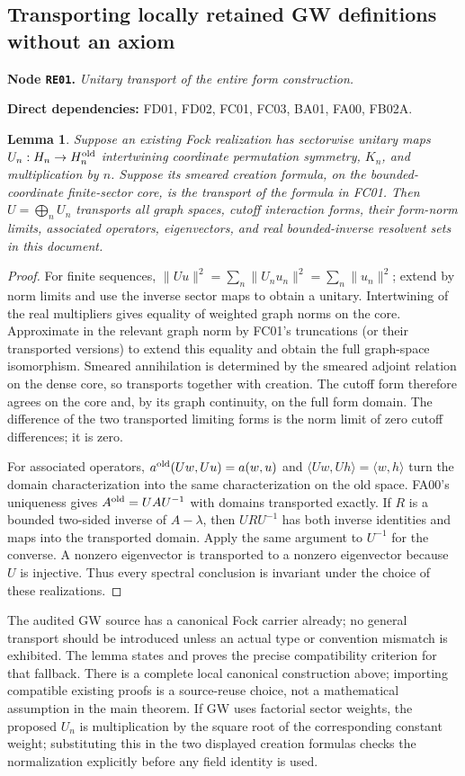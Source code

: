 \documentclass[11pt,a4paper]{article}
\newtheorem{lemma}[theorem]{Lemma}
\theoremstyle{remark}\newtheorem{remark}[theorem]{Remark}
\newcommand{\node}[3]{\par\Needspace{6\baselineskip}\smallskip\hypertarget{node:#1}{}\label{nodepage:#1}\noindent\textbf{Node \texttt{#1}.} \textit{#2.}\par\noindent\textbf{Direct dependencies:} #3.\par}
\begin{document}
\subsection{Transporting locally retained GW definitions without an axiom}
\node{RE01}{Unitary transport of the entire form construction}{FD01, FD02, FC01, FC03, BA01, FA00, FB02A}
\begin{lemma}\label{lem:GWtransport}
Suppose an existing Fock realization has sectorwise unitary maps $U_n:H_n\to H_n^{\rm old}$ intertwining coordinate permutation symmetry, $K_n$, and multiplication by $n$. Suppose its smeared creation formula, on the bounded-coordinate finite-sector core, is the transport of the formula in FC01. Then $U=\bigoplus_nU_n$ transports all graph spaces, cutoff interaction forms, their form-norm limits, associated operators, eigenvectors, and real bounded-inverse resolvent sets in this document.
\end{lemma}
\begin{proof}
For finite sequences, $\|Uu\|^2=\sum_n\|U_nu_n\|^2=\sum_n\|u_n\|^2$; extend by norm limits and use the inverse sector maps to obtain a unitary. Intertwining of the real multipliers gives equality of weighted graph norms on the core. Approximate in the relevant graph norm by FC01's truncations (or their transported versions) to extend this equality and obtain the full graph-space isomorphism. Smeared annihilation is determined by the smeared adjoint relation on the dense core, so transports together with creation. The cutoff form therefore agrees on the core and, by its graph continuity, on the full form domain. The difference of the two transported limiting forms is the norm limit of zero cutoff differences; it is zero.

For associated operators, $a^{\rm old}(Uw,Uu)=a(w,u)$ and $\langle Uw,Uh\rangle=\langle w,h\rangle$ turn the domain characterization into the same characterization on the old space. FA00's uniqueness gives $A^{\rm old}=UAU^{-1}$ with domains transported exactly. If $R$ is a bounded two-sided inverse of $A-\lambda$, then $URU^{-1}$ has both inverse identities and maps into the transported domain. Apply the same argument to $U^{-1}$ for the converse. A nonzero eigenvector is transported to a nonzero eigenvector because $U$ is injective. Thus every spectral conclusion is invariant under the choice of these realizations.
\end{proof}
The audited GW source has a canonical Fock carrier already; no general transport should be introduced unless an actual type or convention mismatch is exhibited. The lemma states and proves the precise compatibility criterion for that fallback. There is a complete local canonical construction above; importing compatible existing proofs is a source-reuse choice, not a mathematical assumption in the main theorem. If GW uses factorial sector weights, the proposed $U_n$ is multiplication by the square root of the corresponding constant weight; substituting this in the two displayed creation formulas checks the normalization explicitly before any field identity is used.
\end{document}
